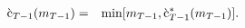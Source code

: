 \begin{eqnarray}
        \grave{\mathrm{c}}_{T-1}({m}_{T-1}) & = & \min[{m}_{T-1},\grave{\mathrm{c}}^{\ast}_{T-1}({m}_{T-1})] \label{eq:LiqCons}.
\end{eqnarray}
